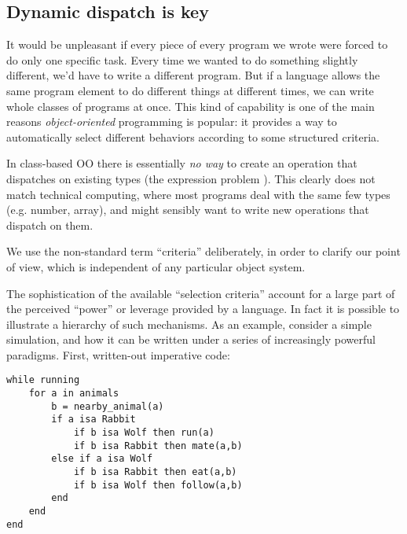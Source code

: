 \subsection{Dynamic dispatch is key}

It would be unpleasant if every piece of every program we wrote were forced
to do only one specific task. Every time we wanted to do something slightly
different, we'd have to write a different program. But if a language
allows the same program element to do different things at different times,
we can write whole classes of programs at once. This kind of capability is
one of the main reasons \emph{object-oriented} programming is popular: it
provides a way to automatically select different behaviors according to
some structured criteria.

In class-based OO there is essentially \emph{no way} to create an operation
that dispatches on existing types (the expression problem \cite{wadler1998expression}).
This clearly
does not match technical computing, where most programs deal with the same
few types (e.g. number, array), and might sensibly want to write new operations
that dispatch on them.


We use the non-standard term ``criteria'' deliberately, in order
to clarify our point of view, which is independent of any particular
object system.

The sophistication of the available ``selection criteria'' account for a
large part of the perceived ``power'' or leverage provided by a language.
In fact it is possible to illustrate a hierarchy of such mechanisms.
As an example, consider a simple simulation, and how it can be written
under a series of increasingly powerful paradigms. First, written-out
imperative code:

\begin{singlespace}
\begin{verbatim}
while running
    for a in animals
        b = nearby_animal(a)
        if a isa Rabbit
            if b isa Wolf then run(a)
            if b isa Rabbit then mate(a,b)
        else if a isa Wolf
            if b isa Rabbit then eat(a,b)
            if b isa Wolf then follow(a,b)
        end
    end
end
\end{verbatim}
\end{singlespace}

